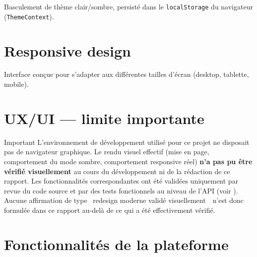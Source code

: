 Basculement de th\`eme clair/sombre, persist\'e dans le \texttt{localStorage} du navigateur (\texttt{ThemeContext}).

\section{Responsive design}

Interface con\c{c}ue pour s'adapter aux diff\'erentes tailles d'\'ecran (desktop, tablette, mobile).

\section{UX/UI --- limite importante}

\begin{noteflag}{Important}
L'environnement de d\'eveloppement utilis\'e pour ce projet ne disposait pas de navigateur graphique. Le rendu visuel effectif (mise en page, comportement du mode sombre, comportement responsive r\'eel) \textbf{n'a pas pu \^etre v\'erifi\'e visuellement} au cours du d\'eveloppement ni de la r\'edaction de ce rapport. Les fonctionnalit\'es correspondantes ont \'et\'e valid\'ees uniquement par revue du code source et par des tests fonctionnels au niveau de l'API (voir ). Aucune affirmation de type \guillemotleft~redesign moderne valid\'e visuellement~\guillemotright\ n'est donc formul\'ee dans ce rapport au-del\`a de ce qui a \'et\'e effectivement v\'erifi\'e.
\end{noteflag}

\section{Fonctionnalit\'es de la plateforme}

